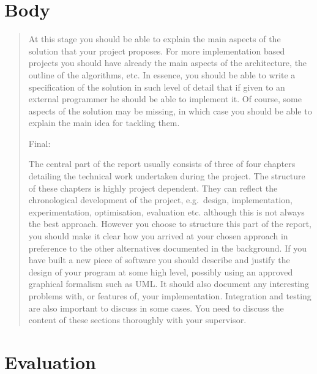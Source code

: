\documentclass{report}
\begin{document}
\section{Body}

\begin{quote}
At this stage you should be able to explain the main aspects of the
solution that your project proposes. For more implementation based
projects you should have already the main aspects of the
architecture, the outline of the algorithms, etc. In essence, you
should be able to write a specification of the solution in such
level of detail that if given to an external programmer he should
be able to implement it. Of course, some aspects of the solution
may be missing, in which case you should be able to explain the
main idea for tackling them.

Final:

The central part of the report usually consists of three of four
chapters detailing the technical work undertaken during the
project. The structure of these chapters is highly project
dependent. They can reflect the chronological development of the
project, e.g.~design, implementation, experimentation,
optimisation, evaluation etc. although this is not always the best
approach. However you choose to structure this part of the report,
you should make it clear how you arrived at your chosen approach in
preference to the other alternatives documented in the background.
If you have built a new piece of software you should describe and
justify the design of your program at some high level, possibly
using an approved graphical formalism such as UML. It should also
document any interesting problems with, or features of, your
implementation. Integration and testing are also important to
discuss in some cases. You need to discuss the content of these
sections thoroughly with your supervisor.

\end{quote}
\section{Evaluation}
\end{document}
